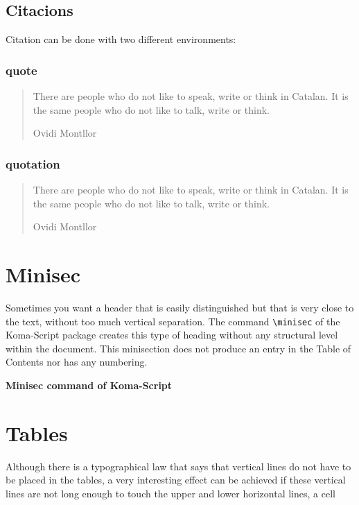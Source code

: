 \documentclass[a4paper,
                             twoside,
                             BCOR=1.0cm,
                             DIV=11,
                             parskip=full,
                             11pt]{scrbook}
\providecommand{\minisec}[1]{\par\medskip\noindent\textbf{#1}\par\nobreak\smallskip}
\begin{document}
\subsection{Citacions}\label{sbsec:citations}
Citation can be done with two different environments:
\subsubsection{quote}\label{sbsec:quote}

\begin{quote}
    There are people who do not like to speak, write or think in Catalan. It is the same people who do not like to talk, write or think.

    Ovidi Montllor
\end{quote}

\subsubsection{quotation}\label{sbsec:quotation}
\begin{quotation}
    There are people who do not like to speak, write or think in Catalan. It is the same people who do not like to talk, write or think.

    Ovidi Montllor
\end{quotation}

\section{Minisec}\label{sec:minisec}
Sometimes you want a header that is easily distinguished but that is very close to the text, without too much vertical separation. The command \verb+\minisec+ of the Koma-Script package creates this type of heading without any structural level within the document. This minisection does not produce an entry in the Table of Contents nor has any numbering.

\minisec{Minisec command of Koma-Script}
\lipsum[1-2]

\section{Tables}\label{sec:tables}

Although there is a typographical law that says that vertical lines do not have to be placed in the tables, a very interesting effect can be achieved if these vertical lines are not long enough to touch the upper and lower horizontal lines, a cell
\end{document}
